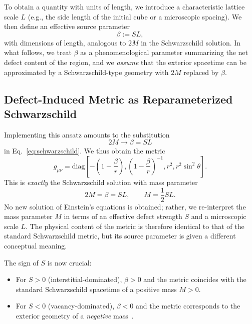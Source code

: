 \documentclass[%
  reprint,
  superscriptaddress,
  showpacs,
  showkeys,
  amsmath,amssymb,
  pra,
  longbibliography,
  floatfix,
  x11names
]{revtex4-2}
\begin{document}
To obtain a quantity with units of length, we introduce a characteristic lattice scale \(L\) (e.g., the side length of the initial cube or a microscopic spacing). We then define an effective source parameter
\begin{equation}
\beta := S L,
\end{equation}
with dimensions of length, analogous to \(2M\) in the Schwarzschild solution. In what follows, we treat \(\beta\) as a phenomenological parameter summarizing the net defect content of the region, and we \emph{assume} that the exterior spacetime can be approximated by a Schwarzschild-type geometry with \(2M\) replaced by \(\beta\).

\subsection{Defect-Induced Metric as Reparameterized Schwarzschild}
\label{2025-menger-gmld}

Implementing this ansatz amounts to the substitution
\begin{equation}
2M \longrightarrow \beta = SL
\end{equation}
in Eq.~\eqref{eq:schwarzschild}. We thus obtain the metric
\begin{equation}
g_{\mu\nu} = \text{diag}\left[-\left(1 - \frac{\beta}{r}\right), \left(1 - \frac{\beta}{r}\right)^{-1}, r^2, r^2 \sin^2 \theta\right].
\label{eq:defect_metric}
\end{equation}
This is \emph{exactly} the Schwarzschild solution with mass parameter
\begin{equation}
2M = \beta = SL, \qquad M = \frac{1}{2} SL.
\end{equation}
No new solution of Einstein's equations is obtained; rather, we re-interpret the mass parameter \(M\) in terms of an effective defect strength \(S\) and a microscopic scale \(L\). The physical content of the metric is therefore identical to that of the standard Schwarzschild metric, but its source parameter is given a different conceptual meaning.

The sign of \(S\) is now crucial:

\begin{itemize}
\item For \(S > 0\) (interstitial-dominated), \(\beta>0\) and the metric coincides with the standard Schwarzschild spacetime of a positive mass \(M>0\).
\item For \(S < 0\) (vacancy-dominated), \(\beta<0\) and the metric corresponds to the exterior geometry of a \emph{negative} mass~\cite{bondi-1957}.
\end{itemize}
\end{document}
